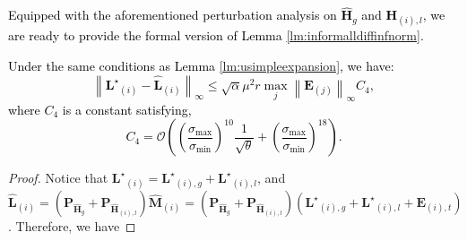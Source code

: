 \documentclass[twoside,11pt]{article}
\newcommand{\revise}[1]{\textcolor{black}{ #1}}
\newcommand{\norm}[1]{\left\lVert#1\right\rVert}
\newcommand{\matE}{\mathbf{E}}
\newcommand{\matH}{\mathbf{H}}
\newcommand{\hmatH}{{\hat{\mathbf{H}}}{}}
\newcommand{\matLst}{{\mathbf{L}^\star}}
\newcommand{\matP}{\mathbf{P}}
\newcommand{\hmatL}{\hat{\mathbf{L}}}
\newcommand{\hmatM}{\hat{\mathbf{M}}}
\newcommand{\gop}{\sigma_{\max}}
\newcommand{\sm}{\sigma_{\min}}
\newcommand{\bcnum}{\left(\frac{\gop}{\sm}\right)}
\begin{document}
\revise{Equipped with the aforementioned perturbation analysis on $\hmatH_g$ and $\matH_{(i),l}$, we are ready to provide the formal version of Lemma \ref{lm:informalldiffinfnorm}.
\begin{lemma}
\label{lm:ldiffinfnorm}
Under the same conditions as Lemma \ref{lm:usimpleexpansion}, we have:
$$
\norm{\matLst_{(i)}- \hmatL_{(i)}}_{\infty}\le \sqrt{\alpha} \mu^2 r \max_j\norm{\matE_{(j)}}_{\infty} C_4,
$$
where $C_4$ is a constant satisfying,
\begin{equation}
C_4= \mathcal{O}\left(\bcnum^{10}\frac{1}{\sqrt{\theta}}+\bcnum^{18}\right).
\end{equation}
\end{lemma}}
\begin{proof}
Notice that $\matLst_{(i)}=\matLst_{(i),g}+\matLst_{(i),l}$, and $\hmatL_{(i)}=(\matP_{\hmatH_g}+\matP_{\hmatH_{(i),l}})\hmatM_{(i)}=(\matP_{\hmatH_g}+\matP_{\hmatH_{(i),l}})( \matLst_{(i),g}+\matLst_{(i),l}+\matE_{(i),t})$. Therefore, we have



\end{proof}
\end{document}
